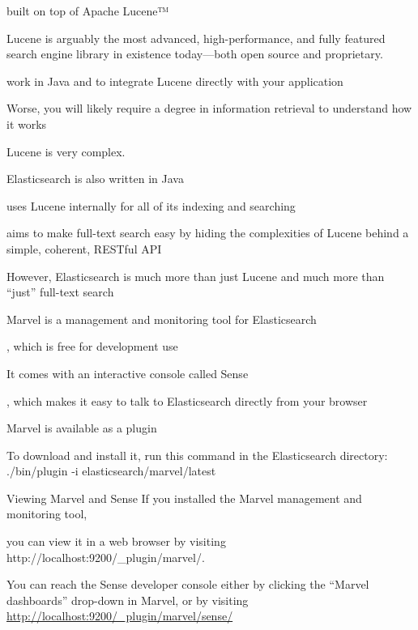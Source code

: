 
built on top of Apache Lucene™

Lucene is arguably the most advanced, high-performance, and fully featured search engine library in existence today—both open source and proprietary.

work in Java and to integrate Lucene directly with your application

Worse, you will likely require a degree in information retrieval to understand how it works

Lucene is very complex.

Elasticsearch is also written in Java

uses Lucene internally for all of its indexing and searching

aims to make full-text search easy by hiding the complexities of Lucene behind a simple, coherent, RESTful API

However, Elasticsearch is much more than just Lucene and much more than “just” full-text search

Marvel is a management and monitoring tool for Elasticsearch

, which is free for development use

It comes with an interactive console called Sense

, which makes it easy to talk to Elasticsearch directly from your browser

Marvel is available as a plugin

To download and install it, run this command in the Elasticsearch directory: ./bin/plugin -i elasticsearch/marvel/latest 

Viewing Marvel and Sense If you installed the Marvel management and monitoring tool, 

you can view it in a web browser by visiting http://localhost:9200/_plugin/marvel/.

You can reach the Sense developer console either by clicking the “Marvel dashboards” drop-down in Marvel, or by visiting \url{http://localhost:9200/_plugin/marvel/sense/}
